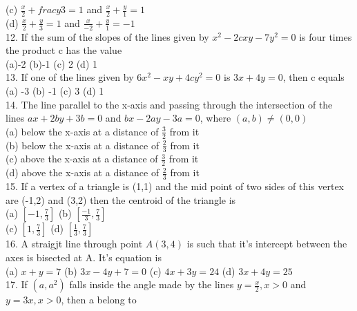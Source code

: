 \documentclass[12pt]{article}
\begin{document}
(c) $\frac{x}{2}+frac{y}{3}=1$ and $\frac{x}{2}+\frac{y}{1}=1$\\
(d) $\frac{x}{2}+\frac{y}{3}=1$ and $\frac{x}{-2}+\frac{y}{1}=-1$\\
12. If the sum of the slopes of the lines given by $x^2-2cxy-7y^2=0$ is four times the product c has the value\\
(a)-2 \hspace{1cm} (b)-1 \hspace{1cm} (c) 2 \hspace{1cm} (d) 1\\
13. If one of the lines given by $6x^2-xy+4cy^2=0$ is $3x+4y=0$, then c equals \\
(a) -3 \hspace{1cm} (b) -1 \hspace{1cm} (c)  3 \hspace{1cm} (d)  1\\
14. The line parallel to the x-axis and passing through the intersection of the lines $ax+2by+3b=0$ and $bx-2ay-3a=0$, where $(a,b) \neq (0,0)$\\
(a) below the x-axis at a distance of $\frac{3}{2}$ from it\\
(b) below the x-axis at a distance of $\frac{2}{3}$ from it\\
(c) above the x-axis at a distance of $\frac{3}{2}$ from it\\
(d) above the x-axis at a distance of $\frac{2}{3}$ from it\\
15. If a vertex of a triangle is (1,1) and the mid point of two sides of this vertex are (-1,2) and (3,2) then the centroid of the triangle is \\
(a) $\left[-1,\frac{7}{3}\right]$ \hspace{1cm}  (b) $\left[ \frac{-1}{3},\frac{7}{3}\right]$ \\
(c)  $\left[1,\frac{7}{3}\right]$  \hspace{1cm} (d)  $\left[ \frac{1}{3},\frac{7}{3}\right]$ \\
 16. A straigjt line through point $A(3,4)$ is such that it's intercept between the axes is bisected at A. It's equation is\\
(a)   $x+y=7$ \hspace{1cm} (b) $3x-4y+7=0$   \hspace{1cm} (c) $4x+3y=24$ \hspace{1cm}
(d) $3x+4y=25$\\
17. If $(a,a^2)$ falls inside the angle made by the lines $y= \frac{x}{2}, x>0$ and $y=3x, x>0$, then a belong to \\
\end{document}
